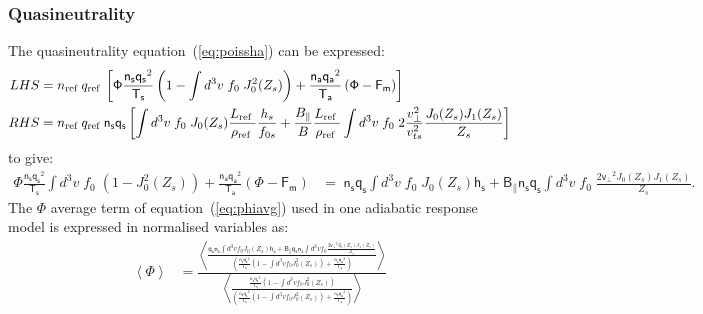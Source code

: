 \documentclass[10pt,a4paper]{article}
\newcommand{\n}[1]{{#1}_{\rm ref\;}}
\newcommand{\g}[1]{\mathsf{#1}}
\newcommand{\flav}[1]{\left\langle{#1}\right\rangle}
\begin{document}
\subsubsection*{Quasineutrality}
The quasineutrality equation~(\ref{eq:poissha}) can be expressed:
 \begin{align*}
   LHS & = \n{n} \n{q} \left[ \g{\Phi} \frac{\g{n_s} \g{q_s}^2}{\g{T_s}}
     \left( 1 - \int d^3v \; f_0 \; J_0^2(Z_s) \right) + \frac{\g{n_a}
       \g{q_a}^2}{\g{T_a}} \left( \g{\Phi} - \g{F_m} \right) \right] \\
   RHS &= \n{n} \n{q} \g{n_s} \g{q_s} \left[ \int d^3v \;f_0 \; J_0(Z_s)
     \frac{\n{L}}{\n{\rho}} \frac{h_s}{f_{0s}} + \frac{B_{\parallel}}{B}
     \frac{\n{L}}{\n{\rho}} \int d^3v \;f_{0} \;2\frac{v_{\perp}^2}{v_{ts}^2}
     \frac{J_0(Z_s) J_1(Z_s)}{Z_s} \right]
\end{align*}
to give:
\begin{align}
  \g{\Phi} \frac{\g{n_s} \g{q_s}^2}{\g{T_s}} \int d^3v \; f_0 \; \left( 1
    -J_0^2(Z_s) \right) + \frac{\g{n_a} \g{q_a}^2}{\g{T_a}} \left( \g{\Phi} -
    \g{F_m} \right) & = \; \g{n_s} \g{q_s} \int d^3v \;f_0 \; J_0(Z_s) \g{h_s}
  + \g{B_{\parallel}} \g{n_s} \g{q_s} \int d^3v \;f_{0} \; \frac{ 2
    \g{v_{\perp}}^2 J_0(Z_s) J_1(Z_s)}{Z_s} \label{eq:npoiss}.
\end{align}
The $\Phi$ average term of equation~(\ref{eq:phiavg}) used in one adiabatic
response model is expressed in normalised variables as:
\begin{align}
  \flav{\g{\Phi}} & = \frac{\flav{ \frac{\g{q_s} \g{n_s} \int d^3v f_0
        J_0(Z_s) \g{h_s} + \g{B_{\parallel}} \g{q_s} \g{n_s} \int d^3v f_{0}
        \frac{2 \g{v_{\perp}}^2 J_0(Z_s) J_1(Z_s)}{Z_s} } {\left(
          \frac{\g{n_s} \g{q_s}^2}{\g{T_s}} \left( 1 - \int d^3v f_{0}
            J_0^2(Z_s) \right) + \frac{\g{n_a} \g{q_a}^2}{\g{T_a}} \right)}}}
  {\flav{ \frac{ \frac{\g{n_s} \g{q_s}^2}{\g{T_s}} \left( 1 - \int d^3v f_{0}
          J_0^2(Z_s) \right) } {\left( \frac{\g{n_s} \g{q_s}^2}{\g{T_s}}
          \left( 1 - \int d^3v f_{0} J_0^2(Z_s) \right) + \frac{\g{n_a}
            \g{q_a}^2}{\g{T_a}} \right)}}} \label{eq:nphiavg}
\end{align}
\end{document}
